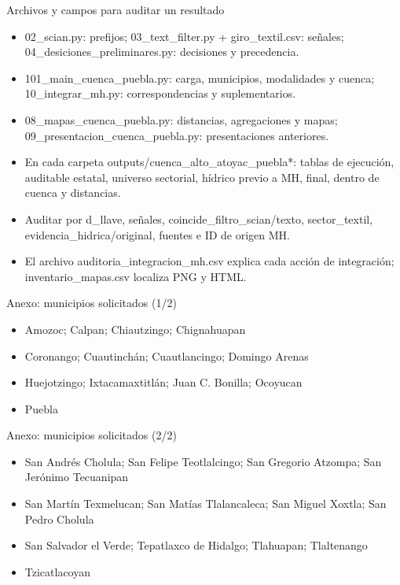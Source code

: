 \documentclass[aspectratio=169,10pt]{beamer}
\begin{document}
\begin{frame}{Archivos y campos para auditar un resultado}
\small
\begin{itemize}
\item 02\_scian.py: prefijos; 03\_text\_filter.py + giro\_textil.csv: señales; 04\_desiciones\_preliminares.py: decisiones y precedencia.
\item 101\_main\_cuenca\_puebla.py: carga, municipios, modalidades y cuenca; 10\_integrar\_mh.py: correspondencias y suplementarios.
\item 08\_mapas\_cuenca\_puebla.py: distancias, agregaciones y mapas; 09\_presentacion\_cuenca\_puebla.py: presentaciones anteriores.
\item En cada carpeta outputs/cuenca\_alto\_atoyac\_puebla*: tablas de ejecución, auditable estatal, universo sectorial, hídrico previo a MH, final, dentro de cuenca y distancias.
\item Auditar por d\_llave, señales, coincide\_filtro\_scian/texto, sector\_textil, evidencia\_hidrica/original, fuentes e ID de origen MH.
\item El archivo auditoria\_integracion\_mh.csv explica cada acción de integración; inventario\_mapas.csv localiza PNG y HTML.
\end{itemize}
\end{frame}
\begin{frame}{Anexo: municipios solicitados (1/2)}
\small
\begin{itemize}
\item Amozoc; Calpan; Chiautzingo; Chignahuapan
\item Coronango; Cuautinchán; Cuautlancingo; Domingo Arenas
\item Huejotzingo; Ixtacamaxtitlán; Juan C. Bonilla; Ocoyucan
\item Puebla
\end{itemize}
\end{frame}
\begin{frame}{Anexo: municipios solicitados (2/2)}
\small
\begin{itemize}
\item San Andrés Cholula; San Felipe Teotlalcingo; San Gregorio Atzompa; San Jerónimo Tecuanipan
\item San Martín Texmelucan; San Matías Tlalancaleca; San Miguel Xoxtla; San Pedro Cholula
\item San Salvador el Verde; Tepatlaxco de Hidalgo; Tlahuapan; Tlaltenango
\item Tzicatlacoyan
\end{itemize}
\end{frame}
\end{document}
